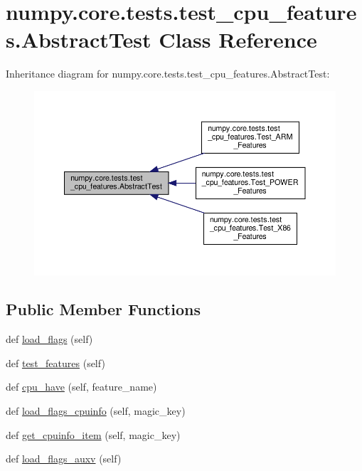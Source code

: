 \hypertarget{classnumpy_1_1core_1_1tests_1_1test__cpu__features_1_1AbstractTest}{}\section{numpy.\+core.\+tests.\+test\+\_\+cpu\+\_\+features.\+Abstract\+Test Class Reference}
\label{classnumpy_1_1core_1_1tests_1_1test__cpu__features_1_1AbstractTest}


Inheritance diagram for numpy.\+core.\+tests.\+test\+\_\+cpu\+\_\+features.\+Abstract\+Test\+:
\nopagebreak
\begin{figure}[H]
\begin{center}
\leavevmode
\includegraphics[width=350pt]{classnumpy_1_1core_1_1tests_1_1test__cpu__features_1_1AbstractTest__inherit__graph}
\end{center}
\end{figure}
\subsection*{Public Member Functions}
\begin{DoxyCompactItemize}
\item 
def \hyperlink{classnumpy_1_1core_1_1tests_1_1test__cpu__features_1_1AbstractTest_a5bcc3d8c63892ff7ab015c2305b0562d}{load\+\_\+flags} (self)
\item 
def \hyperlink{classnumpy_1_1core_1_1tests_1_1test__cpu__features_1_1AbstractTest_a506a1ca83f080aeb2a2aefedae02cbe7}{test\+\_\+features} (self)
\item 
def \hyperlink{classnumpy_1_1core_1_1tests_1_1test__cpu__features_1_1AbstractTest_aef999fab1ee037f07049fa44446417a4}{cpu\+\_\+have} (self, feature\+\_\+name)
\item 
def \hyperlink{classnumpy_1_1core_1_1tests_1_1test__cpu__features_1_1AbstractTest_ae0e79ca79afa3d6a7740f0178b2b9a09}{load\+\_\+flags\+\_\+cpuinfo} (self, magic\+\_\+key)
\item 
def \hyperlink{classnumpy_1_1core_1_1tests_1_1test__cpu__features_1_1AbstractTest_abadf42424a4f47393e320263d5dddd80}{get\+\_\+cpuinfo\+\_\+item} (self, magic\+\_\+key)
\item 
def \hyperlink{classnumpy_1_1core_1_1tests_1_1test__cpu__features_1_1AbstractTest_a864278d005bf1ea2b4dccfffea8eec42}{load\+\_\+flags\+\_\+auxv} (self)
\end{DoxyCompactItemize}
